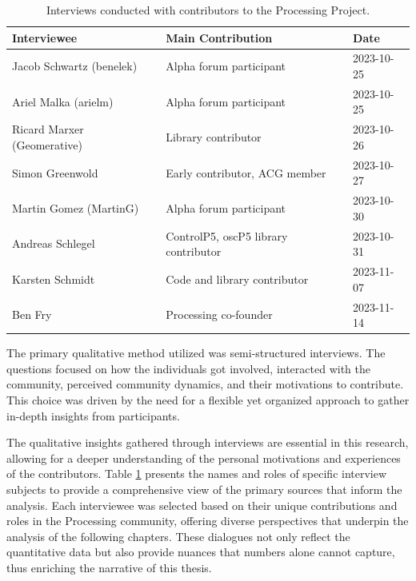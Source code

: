   \begin{table}[ht]
    \begin{adjustbox}{center}
    \begin{tabular}{lll}
    \hline
    Interviewee & Main Contribution & Date \\ \hline
    Jacob Schwartz (benelek) & Alpha forum participant & 2023-10-25 \\
    Ariel Malka (arielm) & Alpha forum participant & 2023-10-25 \\
    Ricard Marxer (Geomerative) & Library contributor & 2023-10-26 \\
    Simon Greenwold & Early contributor, ACG member & 2023-10-27 \\
    Martin Gomez (MartinG) & Alpha forum participant & 2023-10-30 \\
    Andreas Schlegel & ControlP5, oscP5 library contributor & 2023-10-31 \\
    Karsten Schmidt & Code and library contributor & 2023-11-07 \\
    Ben Fry & Processing co-founder & 2023-11-14 \\
    \hline
    \end{tabular}
    \label{tab:interviews}
\end{adjustbox}

    \caption{Interviews conducted with contributors to the Processing Project.}
    \label{tab:interviews}

\end{table}
    
The primary qualitative method utilized was semi-structured interviews. The questions focused on how the individuals got involved, interacted with the community, perceived community dynamics, and their motivations to contribute. This choice was driven by the need for a flexible yet organized approach to gather in-depth insights from participants.

The qualitative insights gathered through interviews are essential in this research, allowing for a deeper understanding of the personal motivations and experiences of the contributors. Table \ref{tab:interviews} presents the names and roles of specific interview subjects to provide a comprehensive view of the primary sources that inform the analysis. Each interviewee was selected based on their unique contributions and roles in the Processing community, offering diverse perspectives that underpin the analysis of the following chapters. These dialogues not only reflect the quantitative data but also provide nuances that numbers alone cannot capture, thus enriching the narrative of this thesis.

